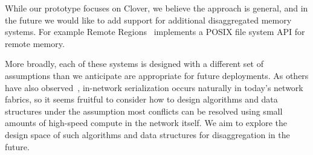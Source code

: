 %
While our prototype focuses on Clover, we believe the
approach is general, and in the future we would like to add support
for additional disaggregated memory systems. For example Remote
Regions~\cite{reigons} implements a POSIX file system API for remote
memory.

More broadly, each of these systems is designed with a different set
of assumptions than we anticipate are appropriate for future
deployments.  As others have also observed~\cite{mom}, in-network
serialization occurs naturally in today's network fabrics, so it seems
fruitful to consider how to design algorithms and data structures
under the assumption most conflicts can be resolved using small
amounts of high-speed compute in the network itself. We aim to explore
the design space of such algorithms and data structures for
disaggregation in the future.
